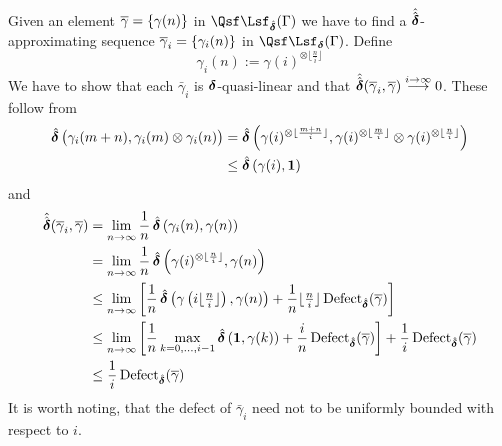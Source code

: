 \begin{Proof}
	Given an element $\bar\gamma=\set{\gamma(n)}$ in
	$\qlin_{\dista}(\Gamma)$ we have to find a $\distaa$-approxi\-ma\-ting
	sequence $\bar\gamma_{i}=\set{\gamma_{i}(n)}$ in
	$\qlin_{\dist}(\Gamma)$.
	Define 
	\[
	\gamma_{i}(n):=\gamma(i)^{\otimes\lfloor\frac{n}{i}\rfloor}
	\]
	We have to show that each $\bar\gamma_{i}$ is $\dist$-quasi-linear and
	that $\distaa(\bar\gamma_{i},\bar\gamma)\too[i\to\infty]0$.
	These follow from 
	\begin{align*}
	\dista\big(\gamma_i(m+n), \gamma_i(m) \otimes \gamma_i(n) \big)
	&=\dista\left( \gamma(i)^{\otimes \lfloor \frac{m+n}{i}\rfloor} , 
	\gamma(i)^{\otimes \lfloor \frac{m}{i}\rfloor } \otimes \gamma(i)^{\otimes \lfloor \frac{n}{i} \rfloor}\right)\\
	&\leq \dista \left( \gamma(i), \bm 1 \right)
	\end{align*} 
	and
	\begin{align*}
	\distaa(\bar\gamma_i,\bar\gamma)
	&= \lim_{n \to \infty} \frac1n\dista\left( \gamma_i(n), \gamma(n) \right) \\
	&= \lim_{n \to \infty} \frac1n \dista \left( \gamma(i)^{\otimes \lfloor\frac{n}{i}\rfloor}, \gamma(n) \right)\\
	&\leq \lim_{n \to \infty} \left[\frac1n \dista \left( \gamma\left(i\lfloor\tfrac{n}{i}\rfloor\right), \gamma(n) \right) + \frac1n \lfloor \tfrac{n}{i} \rfloor \defect_{\dista}(\bar\gamma) \right]\\
	&\leq \lim_{n \to \infty}\left[ \frac1n \max_{k=0,\ldots,i-1} \dista\left(\bm 1, \gamma(k) \right)
	 + \frac{i}{n} \defect_{\dista} (\bar\gamma) \right]
	 + \frac{1}{i} \defect_{\dista}(\bar\gamma)\\
	 &\leq \frac{1}{i} \defect_{\dista}(\bar \gamma)
	\end{align*}
  It is worth noting, that the defect of $\bar\gamma_{i}$ need not to
	be uniformly bounded with respect to $i$.
\end{Proof}






